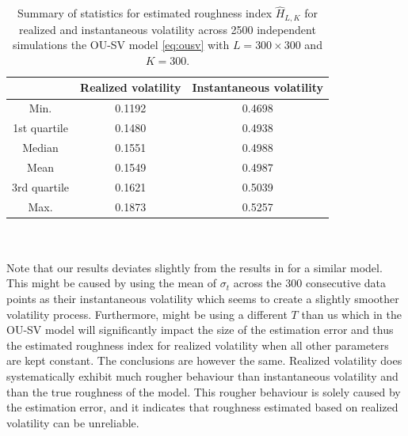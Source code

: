 \documentclass{article}
\begin{document}
\begin{table}[htbp]
    \centering
    \begin{tabular}{ccc}
        \toprule
         & Realized volatility & Instantaneous volatility \\
        \midrule
        Min. & 0.1192 & 0.4698 \\
        1st quartile & 0.1480 & 0.4938 \\
        Median & 0.1551 & 0.4988 \\
        Mean & 0.1549 & 0.4987 \\
        3rd quartile & 0.1621 & 0.5039 \\
        Max. & 0.1873 & 0.5257 \\
        \bottomrule
    \end{tabular}
    \caption{Summary of statistics for estimated roughness index $\hat{H}_{L,K}$ for realized and instantaneous volatility across 2500 independent simulations the OU-SV model \eqref{eq:ousv} with $L=300\times 300$ and $K=300$.}
    \label{tab:ex6dens}
\end{table}\\\\
Note that our results deviates slightly from the results in \cite{cont} for a similar model. This might be caused by \cite{cont} using the mean of $\sigma_t$ across the 300 consecutive data points as their instantaneous volatility which seems to create a slightly smoother volatility process. Furthermore, \cite{cont} might be using a different $T$ than us which in the OU-SV model will significantly impact the size of the estimation error and thus the estimated roughness index for realized volatility when all other parameters are kept constant. The conclusions are however the same. Realized volatility does systematically exhibit much rougher behaviour than instantaneous volatility and than the true roughness of the model. This rougher behaviour is solely caused by the estimation error, and it indicates that roughness estimated based on realized volatility can be unreliable.
\end{document}
